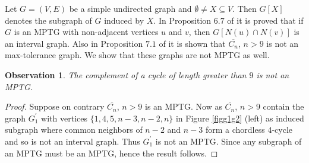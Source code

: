 \documentclass{article}
\newtheorem{obs}[thm]{Observation}
\theoremstyle{definition}
\numberwithin{equation}{section}
\begin{document}
\noindent
Let $G=(V,E)$ be a simple undirected graph and $\emptyset\neq X\subseteq V$. Then $G[X]$ denotes the subgraph of $G$ induced by $X$. In Proposition $6.7$ of \cite{Catanzaro} it is proved that if $G$ is an MPTG with non-adjacent vertices $u$ and $v$, then $G[N(u)\cap N(v)]$ is an interval graph. Also in Proposition $7.1$ of \cite{Kaufmann} it is shown that $\overline{C_{n}}$, $n>9$ is not an max-tolerance graph. We show that these graphs are not MPTG as well.

\begin{obs}\label{ex1}
The complement of a cycle of length greater than $9$ is not an MPTG. 
\end{obs}

\begin{proof}
Suppose on contrary $\overline{C_{n}}$, $n>9$ is an MPTG. Now as $\overline{C_{n}}$, $n>9$ contain the graph $G^{'}_{1}$ with vertices $\{1,4,5,n-3,n-2,n\}$ in Figure \ref{figg1g2} (left) as induced subgraph where common neighbors of $n-2$ and $n-3$ form a chordless $4$-cycle and so is not an interval graph. Thus $G^{'}_{1}$ is not an MPTG. Since any subgraph of an MPTG must be an MPTG, hence the result follows.
\end{proof}
\end{document}
